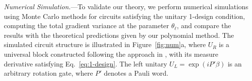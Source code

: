 \documentclass[%
 reprint,
 superscriptaddress,
 amsmath,amssymb,
 aps, prl, twocolumn, showpacs,
]{revtex4-2}
\newtheorem{proposition}{Proposition}
\newcommand{\RomanNumeralCaps}[1]
    {\MakeUppercase{\romannumeral #1}}
\newcommand*{\dif}{\mathop{}\!\mathrm{d}}
\begin{document}

\emph{\label{sec:5} Numerical Simulation.}---To validate our theory, we perform numerical simulations using Monte Carlo methods for circuits satisfying the unitary 1-design condition, computing the total gradient variance at the parameter $\theta_\ell$, and compare the results with the theoretical predictions given by our polynomial method. The simulated circuit structure is illustrated in Figure~\ref{fig:num}a, where $U_R$ is a universal block constructed following the approach in \cite{tilma2002parametrization, tilma2002generalized}, with its measure derivative satisfying Eq.~\eqref{eq:1-design}. The left unitary $U_L = \exp(iP'\beta)$ is an arbitrary rotation gate, where $P'$ denotes a Pauli word. 
\end{document}
